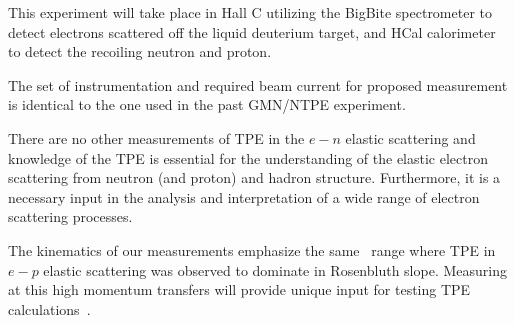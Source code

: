 This experiment will take place in Hall C utilizing the BigBite spectrometer to detect electrons scattered off 
the liquid deuterium target, and HCal calorimeter to detect the recoiling neutron and proton.


The set of instrumentation and required beam current for proposed measurement is identical to the one used in the past GMN/NTPE experiment.

There are no other measurements of TPE in the $e-n$ elastic scattering and knowledge of the TPE is essential for the understanding 
of the elastic electron scattering from neutron (and proton) and hadron structure.  
Furthermore, it is a necessary input in the analysis and interpretation of a wide range of electron scattering processes. 

The kinematics of our measurements emphasize the same \qsq~range where TPE in $e-p$ elastic scattering was observed to dominate in Rosenbluth slope.
Measuring at this high momentum transfers will provide unique input for testing TPE calculations~\cite{Blunden:2005ew}.


